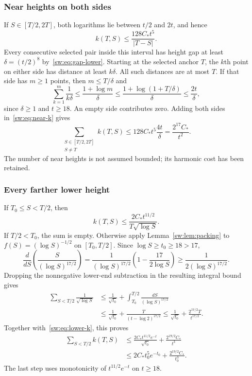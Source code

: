 \documentclass[11pt,a4paper]{article}
\numberwithin{equation}{section}
\theoremstyle{definition}\newtheorem{definition}[theorem]{Definition}
\theoremstyle{remark}\newtheorem{remark}[theorem]{Remark}
\begin{document}
\subsubsection{Near heights on both sides}
If $S\in[T/2,2T]$, both logarithms lie between $t/2$ and $2t$, and hence
\begin{equation}\label{sw:eq:near-k}
 k(T,S)\le\frac{128C_*t^5}{|T-S|}.
\end{equation}
Every consecutive selected pair inside this interval has height gap at least
$\delta=(t/2)^8$ by~\eqref{sw:eq:gap-lower}. Starting at the selected anchor $T$, the $k$th point on either side has distance at least $k\delta$. All such distances are at most $T$. If that side has $m\ge1$ points, then $m\le T/\delta$ and
\[
 \sum_{k=1}^m\frac1{k\delta}
 \le\frac{1+\log m}{\delta}
 \le\frac{1+\log(1+T/\delta)}{\delta}
 \le\frac{2t}{\delta},
\]
since $\delta\ge1$ and $t\ge18$. An empty side contributes zero. Adding both sides in~\eqref{sw:eq:near-k} gives
\begin{equation}\label{sw:eq:near-row}
 \sum_{\substack{S\in[T/2,2T]\\S\ne T}}k(T,S)
 \le128C_*t^5\frac{4t}{\delta}
 =\frac{2^{17}C_*}{t^2}.
\end{equation}
The number of near heights is not assumed bounded; its harmonic cost has been retained.

\subsubsection{Every farther lower height}
If $T_0\le S<T/2$, then
\begin{equation}\label{sw:eq:lower-k}
 k(T,S)\le\frac{2C_*t^{11/2}}{T\sqrt{\log S}}.
\end{equation}
If $T/2<T_0$, the sum is empty. Otherwise apply Lemma~\ref{sw:lem:packing} to $f(S)=(\log S)^{-1/2}$ on $[T_0,T/2]$. Since $\log S\ge t_0\ge18>17$,
\[
 \frac{d}{dS}\left(\frac{S}{(\log S)^{17/2}}\right)
 =\frac{1}{(\log S)^{17/2}}\left(1-\frac{17}{2\log S}\right)
 \ge\frac{1}{2(\log S)^{17/2}}.
\]
Dropping the nonnegative lower-end subtraction in the resulting integral bound gives
\begin{align*}
 \sum_{S<T/2}\frac1{\sqrt{\log S}}
 &\le\frac1{\sqrt{t_0}}+\int_{T_0}^{T/2}\frac{dS}{(\log S)^{17/2}}\\
 &\le\frac1{\sqrt{t_0}}+\frac{T}{(t-\log2)^{17/2}}
 \le\frac1{\sqrt{t_0}}+\frac{2^{17/2}T}{t^{17/2}}.
\end{align*}
Together with~\eqref{sw:eq:lower-k}, this proves
\begin{align}\label{sw:eq:lower-row}
 \sum_{S<T/2}k(T,S)
 &\le\frac{2C_*t^{11/2}e^{-t}}{\sqrt{t_0}}+\frac{2^{19/2}C_*}{t^3}\\
 &\le2C_*t_0^5e^{-t_0}+\frac{2^{19/2}C_*}{t_0^3}.\nonumber
\end{align}
The last step uses monotonicity of $t^{11/2}e^{-t}$ on $t\ge18$.
\end{document}

